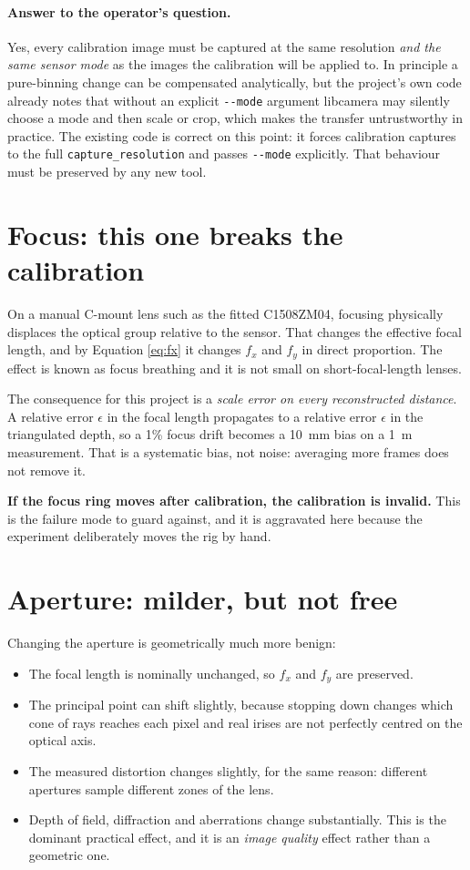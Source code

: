 \paragraph{Answer to the operator's question.} Yes, every calibration image must be captured at the same resolution \emph{and the same sensor mode} as the images the calibration will be applied to. In principle a pure-binning change can be compensated analytically, but the project's own code already notes that without an explicit \texttt{-{}-mode} argument libcamera may silently choose a mode and then scale or crop, which makes the transfer untrustworthy in practice. The existing code is correct on this point: it forces calibration captures to the full \texttt{capture\_resolution} and passes \texttt{-{}-mode} explicitly. That behaviour must be preserved by any new tool.

\section{Focus: this one breaks the calibration}

On a manual C-mount lens such as the fitted C1508ZM04, focusing physically displaces the optical group relative to the sensor. That changes the effective focal length, and by Equation \ref{eq:fx} it changes $f_x$ and $f_y$ in direct proportion. The effect is known as focus breathing and it is not small on short-focal-length lenses.

The consequence for this project is a \emph{scale error on every reconstructed distance}. A relative error $\epsilon$ in the focal length propagates to a relative error $\epsilon$ in the triangulated depth, so a 1\% focus drift becomes a 10~mm bias on a 1~m measurement. That is a systematic bias, not noise: averaging more frames does not remove it.

\textbf{If the focus ring moves after calibration, the calibration is invalid.} This is the failure mode to guard against, and it is aggravated here because the experiment deliberately moves the rig by hand.

\section{Aperture: milder, but not free}

Changing the aperture is geometrically much more benign:

\begin{itemize}
    \item The focal length is nominally unchanged, so $f_x$ and $f_y$ are preserved.
    \item The principal point can shift slightly, because stopping down changes which cone of rays reaches each pixel and real irises are not perfectly centred on the optical axis.
    \item The measured distortion changes slightly, for the same reason: different apertures sample different zones of the lens.
    \item Depth of field, diffraction and aberrations change substantially. This is the dominant practical effect, and it is an \emph{image quality} effect rather than a geometric one.
\end{itemize}

